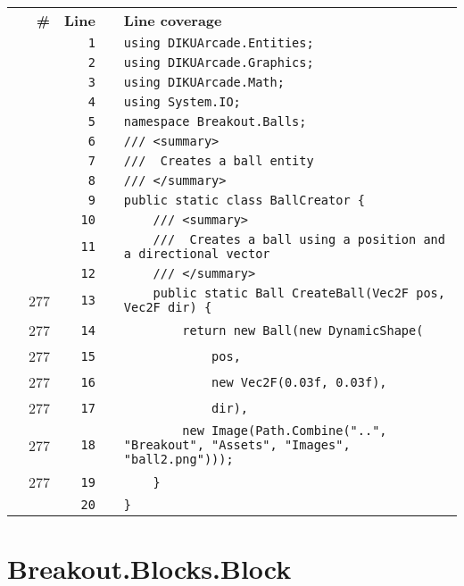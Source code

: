 \documentclass[a4paper,landscape,10pt]{article}
\begin{document}
\begin{longtable}[l]{lrrll}
\textbf{} & \textbf{\#} & \textbf{Line} & \textbf{} & \textbf{Line coverage}\\
\cellcolor{gray} &  & \verb~1~ & & \verb~using DIKUArcade.Entities;~\\
\cellcolor{gray} &  & \verb~2~ & & \verb~using DIKUArcade.Graphics;~\\
\cellcolor{gray} &  & \verb~3~ & & \verb~using DIKUArcade.Math;~\\
\cellcolor{gray} &  & \verb~4~ & & \verb~using System.IO;~\\
\cellcolor{gray} &  & \verb~5~ & & \verb~namespace Breakout.Balls;~\\
\cellcolor{gray} &  & \verb~6~ & & \verb~/// <summary>~\\
\cellcolor{gray} &  & \verb~7~ & & \verb~///  Creates a ball entity~\\
\cellcolor{gray} &  & \verb~8~ & & \verb~/// </summary>~\\
\cellcolor{gray} &  & \verb~9~ & & \verb~public static class BallCreator {~\\
\cellcolor{gray} &  & \verb~10~ & & \verb~    /// <summary>~\\
\cellcolor{gray} &  & \verb~11~ & & \verb~    ///  Creates a ball using a position and a directional vector~\\
\cellcolor{gray} &  & \verb~12~ & & \verb~    /// </summary>~\\
\cellcolor{green} & 277 & \verb~13~ & & \verb~    public static Ball CreateBall(Vec2F pos, Vec2F dir) {~\\
\cellcolor{green} & 277 & \verb~14~ & & \verb~        return new Ball(new DynamicShape(~\\
\cellcolor{green} & 277 & \verb~15~ & & \verb~            pos,~\\
\cellcolor{green} & 277 & \verb~16~ & & \verb~            new Vec2F(0.03f, 0.03f),~\\
\cellcolor{green} & 277 & \verb~17~ & & \verb~            dir),~\\
\cellcolor{green} & 277 & \verb~18~ & & \verb~        new Image(Path.Combine("..", "Breakout", "Assets", "Images", "ball2.png")));~\\
\cellcolor{green} & 277 & \verb~19~ & & \verb~    }~\\
\cellcolor{gray} &  & \verb~20~ & & \verb~}~\\
\end{longtable}
\newpage
\section{Breakout.Blocks.Block}
\end{document}
